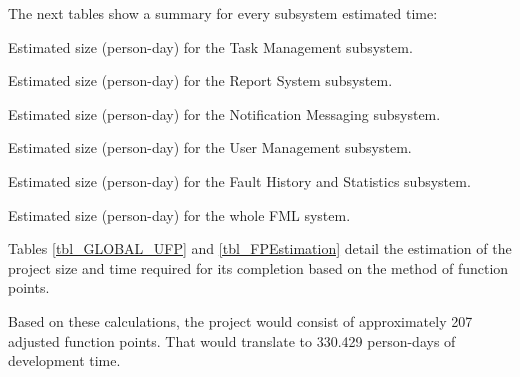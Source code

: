 The next tables show a summary for every subsystem estimated time:

\begin{table}[hbtp]
\centering

\caption{Estimated size (person-day) for the Task Management subsystem.}
\end{table}

\begin{table}[hbtp]
\centering

\caption{Estimated size (person-day) for the Report System subsystem.}
\end{table}

\begin{table}[hbtp]
\centering

\caption{Estimated size (person-day) for the Notification Messaging subsystem.}
\end{table}

\begin{table}[hbtp]
\centering

\caption{Estimated size (person-day) for the User Management subsystem.}
\end{table}

\begin{table}[hbtp]
\centering

\caption{Estimated size (person-day) for the Fault History and Statistics subsystem.}
\end{table}

\begin{table}[hbtp]
\centering

\caption{Estimated size (person-day) for the whole FML system.}
\label{tbl_FPEstimation}
\end{table}

Tables \ref{tbl_GLOBAL_UFP} and \ref{tbl_FPEstimation} detail the estimation of the project size and time required for its completion based on the method of function points.

Based on these calculations, the project would consist of approximately 207 adjusted function points. That would translate to 330.429 person-days of development time.
